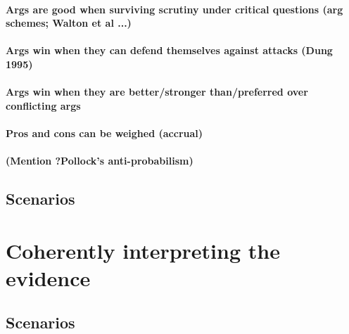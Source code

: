 \documentclass[10pt]{article}
\begin{document}
\paragraph{Args are good when surviving scrutiny under critical questions (arg schemes; Walton et al ...)}

\paragraph{Args win when they can defend themselves against attacks (Dung 1995)}

\paragraph{Args win when they are better/stronger than/preferred over conflicting args}

\paragraph{Pros and cons can be weighed (accrual)}

\paragraph{(Mention ?Pollock's anti-probabilism)}

\subsection{Scenarios}


\section{Coherently interpreting the evidence}
\label{sec:cohint}

\subsection{Scenarios}
\end{document}
